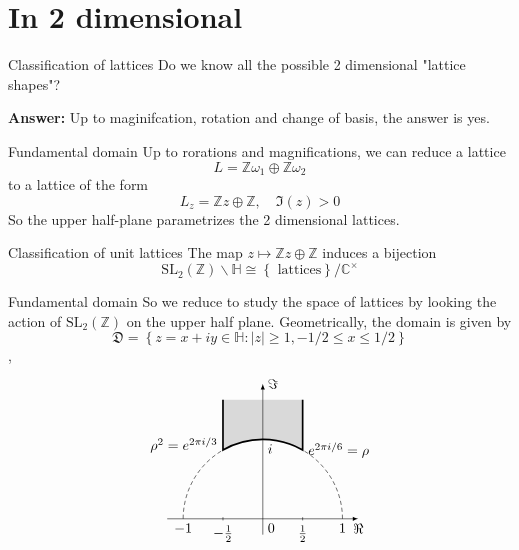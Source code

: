 \documentclass[pdf]{beamer}
\begin{document}
\section{In 2 dimensional}
\begin{frame}{Classification of lattices}
    Do we know all the possible 2 dimensional "lattice shapes"?\vspace{3em}

    \pause
    \textbf{Answer:} Up to maginifcation, rotation and change of basis, the answer is yes.
\end{frame}
\begin{frame}{Fundamental domain}
    Up to rorations and magnifications, we can reduce a lattice
    \[L = \mathbb{Z}\omega_1 \oplus \mathbb{Z}\omega_2\]
    to a lattice of the form
    \[L_z = \mathbb{Z}z\oplus\mathbb{Z}, \quad \Im(z)>0\]
    So the upper half-plane parametrizes the 2 dimensional lattices.
    \begin{block}{Classification of unit lattices}
        The map $z \mapsto \mathbb{Z}z\oplus\mathbb{Z}$ induces a bijection
        \[\text{SL}_2(\mathbb{Z}) \backslash\mathbb{H} \cong \left\lbrace \text{ lattices}\right\rbrace/\mathbb{C^\times}\]
    \end{block}

\end{frame}
\begin{frame}{Fundamental domain}
    So we reduce to study the space of lattices by looking the action of $\text{SL}_2(\mathbb{Z})$ on the upper half plane. Geometrically, the domain is given by
    \[\mathfrak{D} = \left\lbrace z=x+iy \in \mathbb{H}: |z| \ge 1,-1/2 \le x \le 1/2 \right\rbrace \],
    \pause
    \[
        \begin{tikzpicture}[scale=2]
            \draw[densely dashed] (1,0) arc (0:60:1) (-1,0) arc (180:120:1);
            \draw[very thick, fill=gray!30] (.5,1.5) --node[right, pos=1]{$e^{2\pi i/6}=\rho$} (60:1) arc (60:120:1)
            --node[left, pos=.1]{$\rho^2=e^{2\pi i/3}$} (-.5,1.5);
            \draw[-latex] (-1.2,0) -- (1.2,0)node[below]{$\Re$};
            \draw[-latex] (0,-.2) -- (0,1.7)node[right]{$\Im$};
            \path(-1,0) --node[below, pos=0]{$-1$}node[below right, pos=.5]{0}node[below, pos=1]{1} (1,0)
            (0,1)node[below right]{$i$};
            \draw(-.5,.02)--(-.5,-.02)node[below]{$-\frac{1}{2}$}(.5,.02)--(.5,-.02)node[below]{$\frac{1}{2}$};
        \end{tikzpicture}\]
\end{frame}
\end{document}
